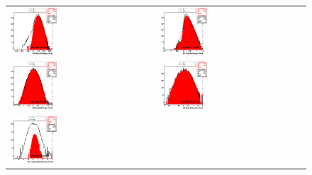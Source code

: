 \begin{figure}[h!]
 \centering
 \begin{tabular}{ll}
  \includegraphics[width=0.33\textwidth]{plots_CaloNoise/h_RecHitEinEB.eps} &
  \includegraphics[width=0.33\textwidth]{plots_CaloNoise/h_RecHitEinEE.eps} \\
  \includegraphics[width=0.33\textwidth]{plots_CaloNoise/h_RecHitEinHB.eps} &
  \includegraphics[width=0.33\textwidth]{plots_CaloNoise/h_RecHitEinHE.eps} \\
  \includegraphics[width=0.33\textwidth]{plots_CaloNoise/h_RecHitEinHFl.eps} &

\end{tabular}
\end{figure}
